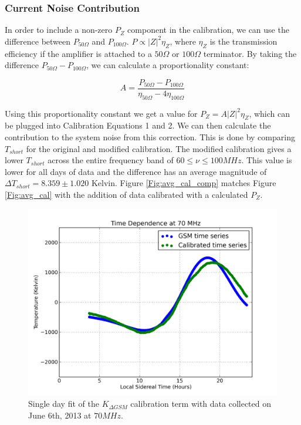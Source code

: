 \subsubsection{Current Noise Contribution}

In order to include a non-zero $P_Z$ component in the calibration, we can use the difference between $P_{50 \Omega}$ and $P_{100 \Omega}$. $P \propto |Z|^2 \eta_{Z}$, where $\eta_Z$ is the transmission efficiency if the amplifier is attached to a $50 \Omega$ or $100 \Omega$ terminator. By taking the difference $P_{50 \Omega}-P_{100 \Omega}$, we can calculate a proportionality constant:

\begin{equation}
A = \frac{P_{50 \Omega} - P_{100 \Omega}}{\eta_{50 \Omega} - 4 \eta_{100 \Omega}}
\end{equation}

Using this proportionality constant we get a value for $P_{Z} = A |Z|^2 \eta_{Z}$, which can be plugged into Calibration Equations 1 and 2. We can then calculate the contribution to the system noise from this correction. This is done by comparing $T_{short}$ for the original and modified calibration. The modified calibration gives a lower $T_{short}$ across the entire frequency band of $60 \leq \nu \leq 100 MHz$. This value is lower for all days of data and the difference has an average magnitude of $\Delta T_{short} = 8.359 \pm 1.020$ Kelvin. Figure \ref{Fig:avg_cal_comp} matches Figure \ref{Fig:avg_cal} with the addition of data calibrated with a calculated $P_{Z}$.

\begin{figure}[htb]
\begin{center}
\includegraphics[width=0.95\linewidth]{Data_analysis/figures/June_06_K_dgsm_time_series.png}
\caption{Single day fit of the $K_{\Delta GSM}$ calibration term with data collected on June 6th, 2013 at $70 MHz$. }
\label{Fig:Kdgsm}
\end{center}
\end{figure}

